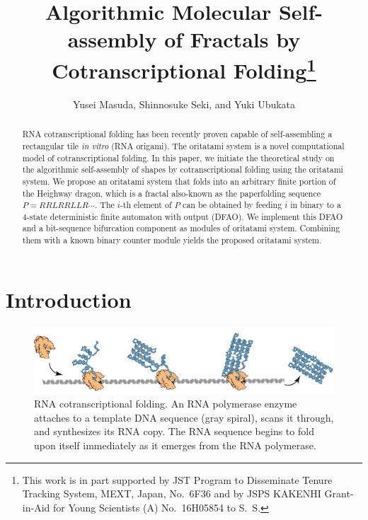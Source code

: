 \documentclass{article}
\title{Algorithmic Molecular Self-assembly of Fractals by Cotranscriptional Folding\footnote{This work is in part supported by JST Program to Disseminate Tenure Tracking System, MEXT, Japan, No.~6F36 and by JSPS KAKENHI Grant-in-Aid for Young Scientists (A) No.~16H05854 to S.~S.}}
\author{Yusei Masuda, Shinnosuke Seki, and Yuki Ubukata}
\theoremstyle{remark}
\begin{document}
\maketitle

\begin{abstract}
RNA cotranscriptional folding has been recently proven capable of self-assembling a rectangular tile \textit{in vitro} (RNA origami). 
The oritatami system is a novel computational model of cotranscriptional folding. 
In this paper, we initiate the theoretical study on the algorithmic self-assembly of shapes by cotranscriptional folding using the oritatami system. 
We propose an oritatami system that folds into an arbitrary finite portion of the Heighway dragon, which is a fractal also-known as the paperfolding sequence $P = RRLRRLLR \cdots$. 
The $i$-th element of $P$ can be obtained by feeding $i$ in binary to a 4-state deterministic finite automaton with output (DFAO). 
We implement this DFAO and a bit-sequence bifurcation component as modules of oritatami system. 
Combining them with a known binary counter module yields the proposed oritatami system. 
\end{abstract}

	\section{Introduction}

\begin{figure}[htb]
\centering
\includegraphics[width=\linewidth]{rna_origami.pdf}
\caption{RNA cotranscriptional folding. 
An RNA polymerase enzyme attaches to a template DNA sequence (gray spiral), scans it through, and synthesizes its RNA copy. 
The RNA sequence begins to fold upon itself immediately as it emerges from the RNA polymerase. 
}
\label{fig:rna_origami}
\end{figure}
\end{document}
